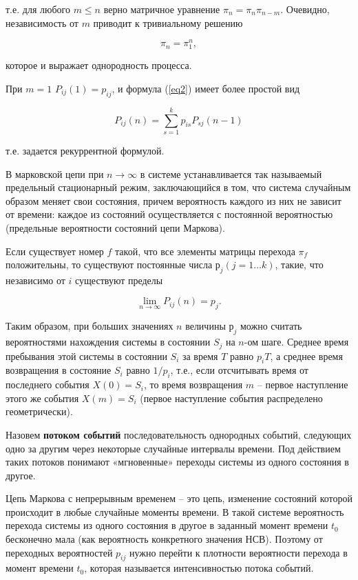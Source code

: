	т.е. для любого $m\leq n$ верно матричное уравнение $\pi_n =\pi_n\pi_{n - m}$. Очевидно, независимость от $m$ приводит к тривиальному решению
	
	$$
	\pi_n = \pi_1^n,
	$$
	
	которое и выражает однородность процесса.
	
	При $m=1$ $P_{ij}(1)= p_{ij}$, и формула (\ref{eq2}) имеет более простой вид
	
	\begin{equation}\label{eq3}
		P_{ij}(n) = \sum_{s = 1}^{k}p_{is}P_{sj}(n-1)
	\end{equation}
	
	т.е. задается рекуррентной формулой.
	
	В марковской цепи при $n\to\infty$ в системе устанавливается так называемый предельный стационарный режим, заключающийся в том, что система случайным образом меняет свои состояния, причем вероятность каждого из них не зависит от времени: каждое из состояний осуществляется с постоянной вероятностью (предельные вероятности состояний цепи Маркова).

	
	\begin{theorem} Если существует номер $f$ такой, что все элементы матрицы перехода $\pi_f$ положительны, то существуют постоянные числа $р_j (j=1\dots k)$, такие, что независимо от $i$ существуют пределы
	
	\begin{equation}\label{eq4}
		\lim\limits_{n\to\infty}P_{ij}(n) = p_j.
	\end{equation}
	\end{theorem}
	
	Таким образом, при больших значениях $n$ величины $р_j$ можно считать вероятностями нахождения системы в состоянии $S_j$ на $n$-ом шаге. Среднее время пребывания этой системы в состоянии $S_i$ за время $T$ равно $p_iT$, а среднее время возвращения в состояние $S_i$ равно $1/p_i$, т.е., если отсчитывать время от последнего события $X(0)=S_i$, то время возвращения $m$ -- первое наступление этого же события $X(m)=S_i$ (первое наступление события распределено геометрически).
	
	Назовем \textbf{потоком событий} последовательность однородных событий, следующих одно за другим через некоторые случайные интервалы времени. Под действием таких потоков понимают «мгновенные» переходы системы из одного состояния в другое.
	
	Цепь Маркова с непрерывным временем -- это цепь, изменение состояний которой происходит в любые случайные моменты времени. В такой системе вероятность перехода системы из одного состояния в другое в заданный момент времени $t_0$ бесконечно мала (как вероятность конкретного значения НСВ). Поэтому от переходных вероятностей $p_{ij}$ нужно перейти к плотности вероятности перехода в момент времени $t_0$, которая называется интенсивностью потока событий.
	
